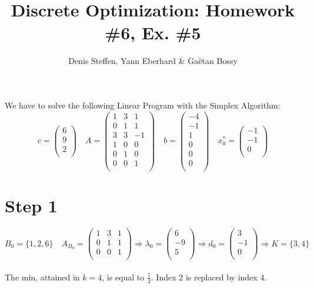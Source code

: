 \documentclass[a4paper,11pt,french]{article}
\title{Discrete Optimization: Homework \#6, Ex. \#5}
\author{Denis Steffen, Yann Eberhard \& Gaëtan Bossy}
\begin{document}
    
    \maketitle
    \noindent We have to solve the following Linear Program with the Simplex Algorithm:
    \begin{displaymath}
    c=\left(\begin{array}{c} 6\\ 9\\ 2\\ \end{array}\right)\quad A=\left(
\begin{array}{ccc}
1 & 3 & 1\\
0 & 1 & 1 \\
3 & 3 & -1\\
1 & 0 & 0\\
0 & 1 & 0\\
0 & 0 & 1\\
\end{array}
\right) \quad b=\left(\begin{array}{c}-4\\-1\\1\\0\\0\\0\\ \end{array}\right)\quad x_{0}^*=\left(\begin{array}{c}-1\\-1\\0\\\end{array}\right)
  \end{displaymath}
\section{Step 1}
  \begin{displaymath}
  B_0=\{1,2,6\}\quad A_{B_0}=\left(
\begin{array}{ccc}
1 & 3 & 1\\
0 & 1 & 1 \\
0 & 0 & 1\\
\end{array}
\right) \Rightarrow \lambda_0=\left(\begin{array}{c} 6\\ -9\\ 5\\ \end{array}\right)\Rightarrow d_0=\left(\begin{array}{c} 3\\ -1\\ 0\\ \end{array}\right)\Rightarrow K=\{3,4\}
   \end{displaymath}
\\
The min, attained in $k=4$, is equal to $\frac{1}{3}$. Index 2 is replaced by index 4.
\end{document}
